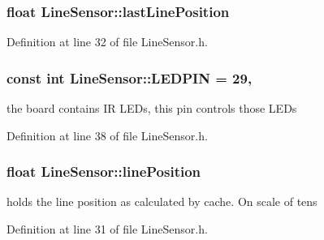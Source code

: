 \hypertarget{classLineSensor_a347e843234a242ded12e83badf4718ed}{
\subsubsection[{last\-Line\-Position}]{\setlength{\rightskip}{0pt plus 5cm}float Line\-Sensor\-::last\-Line\-Position\hspace{0.3cm}{\ttfamily [private]}}}\label{classLineSensor_a347e843234a242ded12e83badf4718ed}


Definition at line 32 of file Line\-Sensor.\-h.

\hypertarget{classLineSensor_a09da44442cb9e026af2053b5d0b4f2ce}{
\subsubsection[{L\-E\-D\-P\-I\-N}]{\setlength{\rightskip}{0pt plus 5cm}const int Line\-Sensor\-::\-L\-E\-D\-P\-I\-N = 29\hspace{0.3cm}{\ttfamily [static]}, {\ttfamily [private]}}}\label{classLineSensor_a09da44442cb9e026af2053b5d0b4f2ce}


the board contains I\-R L\-E\-Ds, this pin controls those L\-E\-Ds 



Definition at line 38 of file Line\-Sensor.\-h.

\hypertarget{classLineSensor_ac21af83a73e9e55500324d9d34ed2498}{
\subsubsection[{line\-Position}]{\setlength{\rightskip}{0pt plus 5cm}float Line\-Sensor\-::line\-Position\hspace{0.3cm}{\ttfamily [private]}}}\label{classLineSensor_ac21af83a73e9e55500324d9d34ed2498}


holds the line position as calculated by cache. On scale of tens 



Definition at line 31 of file Line\-Sensor.\-h.

